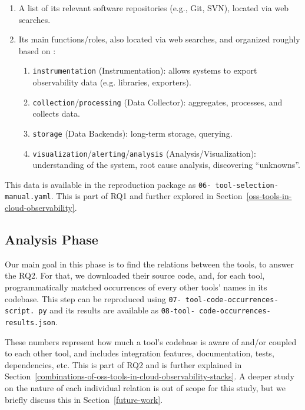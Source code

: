 \documentclass[sigconf]{acmart}
\begin{document}
\begin{enumerate}
\item
  A list of its relevant software repositories (e.g., Git, SVN), located
  via web searches.
\item
  Its main functions/roles, also located via web searches, and organized
  roughly based on \cite{kosinska2023observability}:

  \begin{enumerate}
  \item
    \texttt{instrumentation} (Instrumentation): allows systems to export
    observability data (e.g. libraries, exporters).
  \item
    \texttt{collection}/\texttt{processing} (Data Collector):
    aggregates, processes, and collects data.
  \item
    \texttt{storage} (Data Backends): long-term storage, querying.
  \item
    \texttt{visualization}/\texttt{alerting}/\texttt{analysis}
    (Analysis/Visualization): understanding of the system, root cause
    analysis, discovering ``unknowns''.
  \end{enumerate}
\end{enumerate}

This data is available in the reproduction package as \texttt{06-\allowbreak
tool-\allowbreak selection-\allowbreak manual.\allowbreak yaml}. This is part of
RQ1 and further explored in Section~\ref{oss-tools-in-cloud-observability}.

\subsection{Analysis Phase}\label{analysis-phase}

Our main goal in this phase is to find the relations between the tools, to
answer the RQ2. For that, we downloaded their source code, and, for each
tool, programmatically matched occurrences of every other tools' names
in its codebase. This step can be reproduced using \texttt{07-\allowbreak
tool-\allowbreak code-\allowbreak occurrences-\allowbreak script.\allowbreak
py} and its results are available as \texttt{08-\allowbreak tool-\allowbreak
code-\allowbreak occurrences-\allowbreak results.\allowbreak json}.

These numbers represent how much a tool's codebase is aware of and/or
coupled to each other tool, and includes integration features, documentation,
tests, dependencies, etc. This is part of RQ2 and is further explained in
Section~\ref{combinations-of-oss-tools-in-cloud-observability-stacks}. A deeper
study on the nature of each individual relation is out of scope for this study,
but we briefly discuss this in Section~\ref{future-work}.
\end{document}
